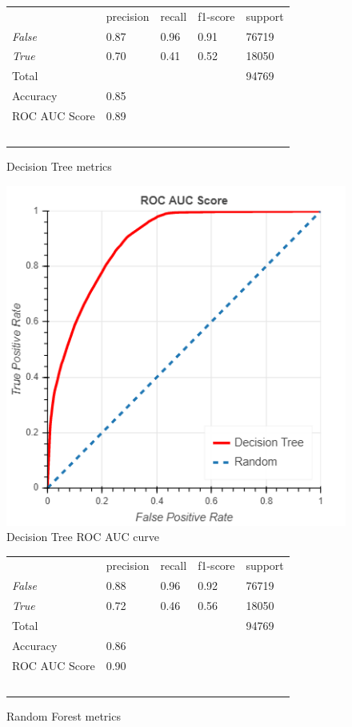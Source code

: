 \documentclass[10pt, conference, compsocconf]{IEEEtran}
\begin{document}
\begin{figure}
  \begin{tabular}{lllll}
                  & precision & recall      & f1-score  & support \\
  \textit{False}  & 0.87      & 0.96        & 0.91      & 76719 \\
  \textit{True}   & 0.70      & 0.41        & 0.52      & 18050 \\
  Total			      &           &             &           & 94769 \\
  Accuracy        & 0.85 \\
  ROC AUC Score	  & 0.89 \\\
  \end{tabular}
  \caption{Decision Tree metrics}
  \label{fig:decision_tree_metrics}
\end{figure}

\begin{figure}
  \includegraphics[scale=0.45]{decision_tree_roc}
  \centering
  \caption{Decision Tree ROC AUC curve}
  \label{fig:decision_tree_roc}
\end{figure}


\begin{figure}
  \begin{tabular}{lllll}
                  & precision & recall      & f1-score  & support \\
  \textit{False}  & 0.88      & 0.96        & 0.92      & 76719 \\
  \textit{True}   & 0.72      & 0.46        & 0.56      & 18050 \\
  Total			      &           &             &           & 94769 \\
  Accuracy        & 0.86 \\
  ROC AUC Score	  & 0.90 \\\
  \end{tabular}
  \caption{Random Forest metrics}
  \label{fig:random_forest_metrics}
\end{figure}
\end{document}
